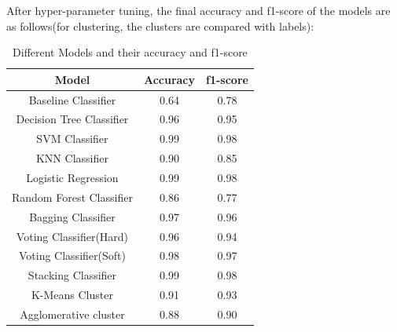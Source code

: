 \documentclass{article}
\begin{document}
After hyper-parameter tuning, the final accuracy and f1-score of the models are as follows(for clustering, the clusters are compared with labels):

\begin{table}[H]
    \centering
    \begin{tabular}{|c|c|c|}
        \hline
        \textbf{Model} & \textbf{Accuracy} & \textbf{f1-score}\\
        \hline
        Baseline Classifier & 0.64 & 0.78 \\
        \hline
        Decision Tree Classifier & 0.96 & 0.95 \\
        \hline
        SVM Classifier & 0.99 & 0.98 \\
        \hline
        KNN Classifier & 0.90 & 0.85 \\
        \hline
        Logistic Regression & 0.99 & 0.98 \\
        \hline
        Random Forest Classifier & 0.86 & 0.77 \\
        \hline
        Bagging Classifier & 0.97 & 0.96 \\
        \hline
        Voting Classifier(Hard) & 0.96 & 0.94 \\
        \hline
        Voting Classifier(Soft) & 0.98 & 0.97 \\
        \hline
        Stacking Classifier & 0.99 & 0.98 \\
        \hline
        K-Means Cluster & 0.91 & 0.93 \\
        \hline
        Agglomerative cluster & 0.88 & 0.90 \\
        \hline
    \end{tabular}
    \caption{Different Models and their accuracy and f1-score}
    \label{tab:result}
\end{table}
\end{document}
